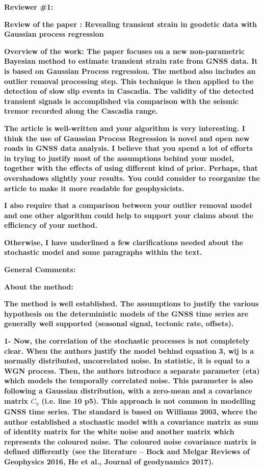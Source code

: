 \documentclass[10pt,a4paper]{letter}
\begin{document}
\begin{letter}{}
\textbf{Reviewer \#1:}\newline

\textbf{Review of the paper : Revealing transient strain in geodetic data
with Gaussian process regression}

\textbf{Overview of the work: The paper focuses on a new non-parametric
Bayesian method to estimate transient strain rate from GNSS data. It
is based on Gaussian Process regression. The method also includes an
outlier removal processing step. This technique is then applied to the
detection of slow slip events in Cascadia. The validity of the
detected transient signals is accomplished via comparison with the
seismic tremor recorded along the Cascadia range.}


\textbf{The article is well-written and your algorithm is very interesting. I
think the use of Gaussian Process Regression is novel and open new
roads in GNSS data analysis. I believe that you spend a lot of efforts
in trying to justify most of the assumptions behind your model,
together with the effects of using different kind of prior. Perhaps,
that overshadows slightly your results. You could consider to
reorganize the article to make it more readable for geophysicists.}


\textbf{I also require that a comparison between your outlier removal model
and one other algorithm could help to support your claims about the
efficiency of your method.}

\textbf{Otherwise, I have underlined a few clarifications needed about the
stochastic model and some paragraphs within the text.}


\textbf{General Comments:}

\textbf{About the method:}

\textbf{The method is well established. The assumptions to justify the various
hypothesis on the deterministic models of the GNSS time series are
generally well supported (seasonal signal, tectonic rate, offsets).}

\textbf{1- Now, the correlation of the stochastic processes is not completely
clear. When the authors justify the model behind equation 3, wij is a
normally distributed, uncorrelated noise. In statistic, it is equal to
a WGN process. Then, the authors introduce a separate parameter (eta)
which models the temporally correlated noise. This parameter is also
following a Gaussian distribution, with a zero-mean and a covariance
matrix $C_{\eta}$ (i.e. line 10 p5). This approach is not common in
modelling GNSS time series. The standard is based on Williams 2003,
where the author established a stochastic model with a covariance
matrix as sum of identity matrix for the white noise and another
matrix which represents the coloured noise. The coloured noise
covariance matrix is defined differently (see the literature – Bock and
Melgar Reviews of Geophysics 2016, He et al., Journal of geodynamics
2017).}



\end{letter}
\end{document}
